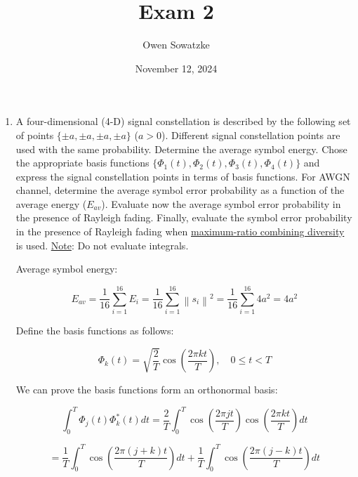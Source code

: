 \documentclass[fleqn]{article}
\title{Exam 2}
\author{Owen Sowatzke}
\date{November 12, 2024}
\newcommand{\zerodisplayskip}{
	\setlength{\abovedisplayskip}{0pt}%
	\setlength{\belowdisplayskip}{0pt}%
	\setlength{\abovedisplayshortskip}{0pt}%
	\setlength{\belowdisplayshortskip}{0pt}%
	\setlength{\mathindent}{0pt}}
\newcommand{\norm}[1]{\left \lVert #1 \right \rVert}
\begin{document}
	\offinterlineskip
	\setlength{\lineskip}{12pt}
	\zerodisplayskip
	\maketitle
	
	\begin{enumerate}
		\item A four-dimensional (4-D) signal constellation is described by the following set of points $\{\pm a, \pm a, \pm a, \pm a\}$ ($a>0$). Different signal constellation points are used with the same probability. Determine the average symbol energy. Chose the appropriate basis functions $\{\Phi_1(t), \Phi_2(t), \Phi_3(t), \Phi_4(t)\}$ and express the signal constellation points in terms of basis functions. For AWGN channel, determine the average symbol error probability as a function of the average energy ($E_{av}$). Evaluate now the average symbol error probability in the presence of Rayleigh fading. Finally, evaluate the symbol error probability in the presence of Rayleigh fading when \underline{maximum-ratio combining diversity} is used. \underline{Note}: Do not evaluate integrals.

		Average symbol energy:
		
		\begin{equation*}
			E_{av} = \frac{1}{16}\sum_{i=1}^{16}{E_i} = \frac{1}{16}\sum_{i=1}^{16}{\norm{s_i}^2} = \frac{1}{16}\sum_{i=1}^{16}{4a^2} = 4a^2
		\end{equation*}
		
		Define the basis functions as follows:
		
		\begin{equation*}
			\Phi_k(t) = \sqrt{\frac{2}{T}}\cos\left(\frac{2{\pi}kt}{T}\right),\quad 0 \leq t < T
		\end{equation*}
		
		We can prove the basis functions form an orthonormal basis:
		
		\begin{equation*}
			\int_{0}^{T}{\Phi_j(t)\Phi_k^*(t)dt} = \frac{2}{T}\int_{0}^{T}{\cos\left(\frac{2{\pi}jt}{T}\right)\cos\left(\frac{2{\pi}kt}{T}\right)dt}
		\end{equation*}
		
		\begin{equation*}
			= \frac{1}{T}\int_{0}^{T}{\cos\left(\frac{2{\pi}(j+k)t}{T}\right)dt} + \frac{1}{T}\int_{0}^{T}{\cos\left(\frac{2{\pi}(j-k)t}{T}\right)dt}
		\end{equation*}
		

\end{enumerate}
\end{document}
